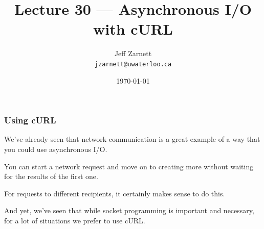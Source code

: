 

\title{Lecture 30 --- Asynchronous I/O with cURL }

\author{Jeff Zarnett \\ \small \texttt{jzarnett@uwaterloo.ca}}
\date{\today}




\begin{frame}
  \titlepage

 \end{frame}

\begin{frame}
\frametitle{Using cURL}

We've already seen that network communication is a great example of a way that you could use asynchronous I/O. 

You can start a network request and move on to creating more without waiting for the results of the first one. 

For requests to different recipients, it certainly makes sense to do this. 

And yet, we've seen that while socket programming is important and necessary, for a lot of situations we prefer to use cURL.

\end{frame}


